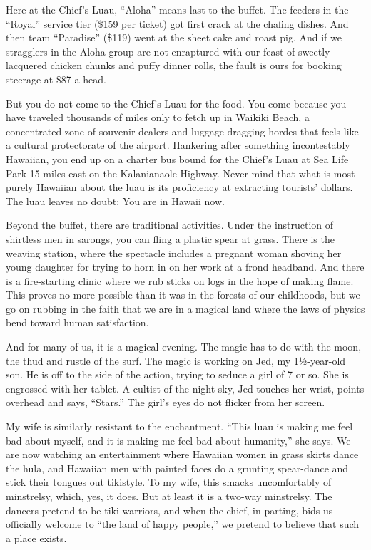 Here at the Chief's Luau, ``Aloha'' means last to the buffet. The
feeders in the ``Royal'' service tier (\$159 per ticket) got first crack
at the chafing dishes. And then team ``Paradise'' (\$119) went at the
sheet cake and roast pig. And if we stragglers in the Aloha group are
not enraptured with our feast of sweetly lacquered chicken chunks and
puffy dinner rolls, the fault is ours for booking steerage at \$87 a
head.

But you do not come to the Chief's Luau for the food. You come because
you have traveled thousands of miles only to fetch up in Waikiki Beach,
a concentrated zone of souvenir dealers and luggage-dragging hordes that
feels like a cultural protectorate of the airport. Hankering after
something incontestably Hawaiian, you end up on a charter bus bound for
the Chief's Luau at Sea Life Park 15 miles east on the Kalanianaole
Highway. Never mind that what is most purely Hawaiian about the luau is
its proficiency at extracting tourists' dollars. The luau leaves no
doubt: You are in Hawaii now.

Beyond the buffet, there are traditional activities. Under the
instruction of shirtless men in sarongs, you can fling a plastic spear
at grass. There is the weaving station, where the spectacle includes a
pregnant woman shoving her young daughter for trying to horn in on her
work at a frond headband. And there is a fire-starting clinic where we
rub sticks on logs in the hope of making flame. This proves no more
possible than it was in the forests of our childhoods, but we go on
rubbing in the faith that we are in a magical land where the laws of
physics bend toward human satisfaction.

And for many of us, it is a magical evening. The magic has to do with
the moon, the thud and rustle of the surf. The magic is working on Jed,
my 1½-year-old son. He is off to the side of the action, trying to
seduce a girl of 7 or so. She is engrossed with her tablet. A cultist of
the night sky, Jed touches her wrist, points overhead and says,
``Stars.'' The girl's eyes do not flicker from her screen.

My wife is similarly resistant to the enchantment. ``This luau is making
me feel bad about myself, and it is making me feel bad about humanity,''
she says. We are now watching an entertainment where Hawaiian women in
grass skirts dance the hula, and Hawaiian men with painted faces do a
grunting spear-dance and stick their tongues out tikistyle. To my wife,
this smacks uncomfortably of minstrelsy, which, yes, it does. But at
least it is a two-way minstrelsy. The dancers pretend to be tiki
warriors, and when the chief, in parting, bids us officially welcome to
``the land of happy people,'' we pretend to believe that such a place
exists.

